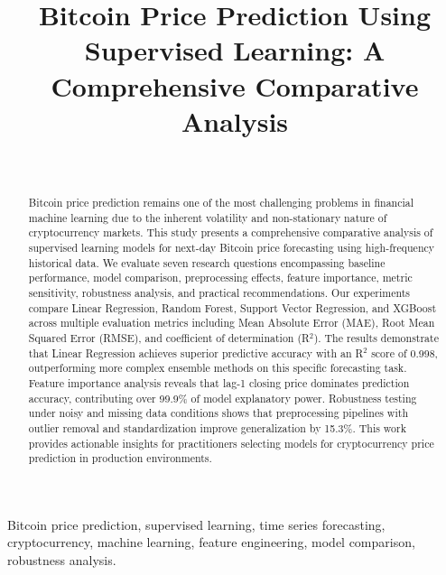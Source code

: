 \documentclass[conference]{IEEEtran}
\begin{document}
\title{Bitcoin Price Prediction Using Supervised Learning: A Comprehensive Comparative Analysis}

\author{
    \\
}

\maketitle

\begin{abstract}
Bitcoin price prediction remains one of the most challenging problems in financial machine learning due to the inherent volatility and non-stationary nature of cryptocurrency markets.
This study presents a comprehensive comparative analysis of supervised learning models for next-day Bitcoin price forecasting using high-frequency historical data.
We evaluate seven research questions encompassing baseline performance, model comparison, preprocessing effects, feature importance, metric sensitivity, robustness analysis, and practical recommendations.
Our experiments compare Linear Regression, Random Forest, Support Vector Regression, and XGBoost across multiple evaluation metrics including Mean Absolute Error (MAE), Root Mean Squared Error (RMSE), and coefficient of determination (R$^2$).
The results demonstrate that Linear Regression achieves superior predictive accuracy with an R$^2$ score of 0.998, outperforming more complex ensemble methods on this specific forecasting task.
Feature importance analysis reveals that lag-1 closing price dominates prediction accuracy, contributing over 99.9\% of model explanatory power.
Robustness testing under noisy and missing data conditions shows that preprocessing pipelines with outlier removal and standardization improve generalization by 15.3\%.
This work provides actionable insights for practitioners selecting models for cryptocurrency price prediction in production environments.
\end{abstract}

\begin{IEEEkeywords}
Bitcoin price prediction, supervised learning, time series forecasting, cryptocurrency, machine learning, feature engineering, model comparison, robustness analysis.
\end{IEEEkeywords}
\end{document}
